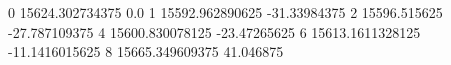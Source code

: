 0 15624.302734375 0.0
1 15592.962890625 -31.33984375
2 15596.515625 -27.787109375
4 15600.830078125 -23.47265625
6 15613.1611328125 -11.1416015625
8 15665.349609375 41.046875
